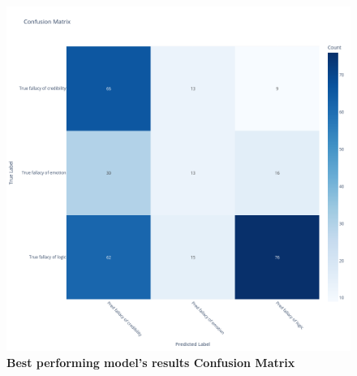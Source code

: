 \begin{figure}[H]
\centering
\includegraphics[width=\textwidth]{graphics/conf_matrix_meta-llama-Meta-Llama-3.1-8B-Instruct_prompt1_no_cot_ARISTOTLE_results_no_definitions_42_no_sampling.png}
\caption{\textbf{Best performing model's results Confusion Matrix}}
\end{figure}


